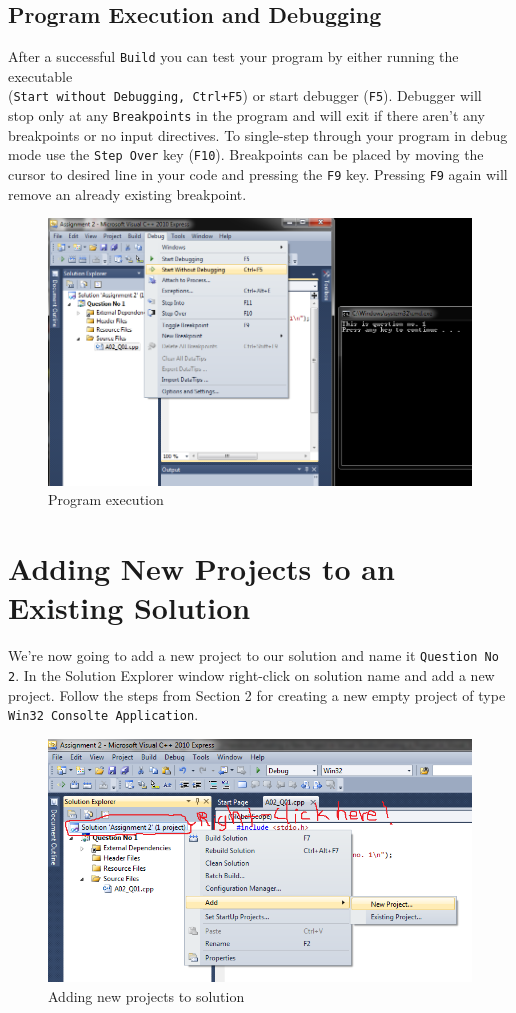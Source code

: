 \documentclass{article}
\begin{document}
\subsection{Program Execution and Debugging}
After a successful \verb|Build| you can test your program by either running the executable\\ (\verb|Start without Debugging, Ctrl+F5|) or start debugger (\verb|F5|). Debugger will stop only at any \verb|Breakpoints| in the program and will exit if there aren't any breakpoints or no input directives. To single-step through your program in debug mode use the \verb|Step Over| key (\verb|F10|). Breakpoints can be placed by moving the cursor to desired line in your code and pressing the \verb|F9| key. Pressing \verb|F9| again will remove an already existing breakpoint.
\begin{figure}[H]
\centering
\includegraphics[scale=0.5]{Start_Without_Debugging.png}
\caption{Program execution}
\end{figure}

\section{Adding New Projects to an Existing Solution}
We're now going to add a new project to our solution and name it \verb|Question No 2|. In the Solution Explorer window right-click on solution name and add a new project. Follow the steps from Section 2 for creating a new empty project of type \verb|Win32 Consolte Application|.
\begin{figure}[H]
\centering
\includegraphics[scale=0.6]{Add_New_Project.png}
\caption{Adding new projects to solution}
\end{figure}
\end{document}
